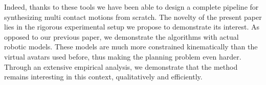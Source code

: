 Indeed, thanks to these tools we have been able to design a complete pipeline for synthesizing multi contact motions from scratch.
The novelty of the present paper lies in the rigorous experimental setup we propose to demonstrate its interest.
As opposed to our previous paper, we demonstrate the algorithms with actual robotic models. These models are much more constrained kinematically than the virtual avatars used before,
thus making the planning problem even harder. Through an extensive empirical analysis, we demonstrate that the method remains interesting in this context, qualitatively and efficiently.

